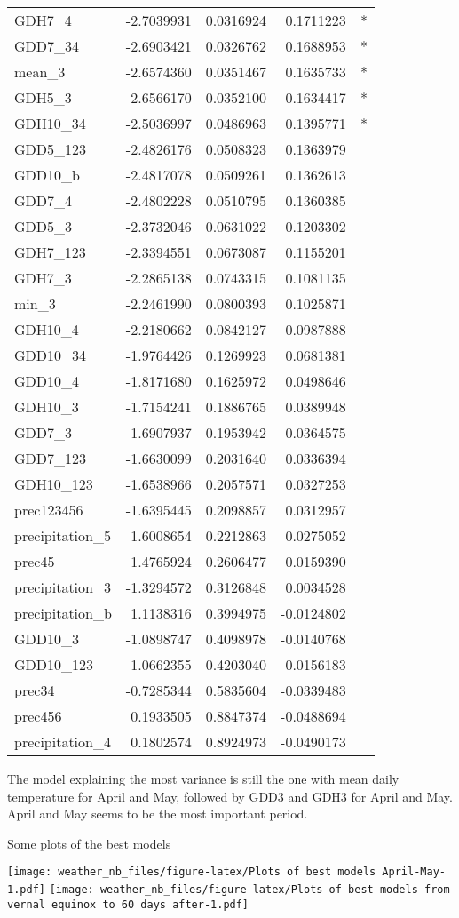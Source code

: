 \documentclass[10pt,]{article}
\begin{document}
\begin{longtable}[]{@{}lrrrl@{}}
GDH7\_4 & -2.7039931 & 0.0316924 & 0.1711223 & *\tabularnewline
GDD7\_34 & -2.6903421 & 0.0326762 & 0.1688953 & *\tabularnewline
mean\_3 & -2.6574360 & 0.0351467 & 0.1635733 & *\tabularnewline
GDH5\_3 & -2.6566170 & 0.0352100 & 0.1634417 & *\tabularnewline
GDH10\_34 & -2.5036997 & 0.0486963 & 0.1395771 & *\tabularnewline
GDD5\_123 & -2.4826176 & 0.0508323 & 0.1363979 &\tabularnewline
GDD10\_b & -2.4817078 & 0.0509261 & 0.1362613 &\tabularnewline
GDD7\_4 & -2.4802228 & 0.0510795 & 0.1360385 &\tabularnewline
GDD5\_3 & -2.3732046 & 0.0631022 & 0.1203302 &\tabularnewline
GDH7\_123 & -2.3394551 & 0.0673087 & 0.1155201 &\tabularnewline
GDH7\_3 & -2.2865138 & 0.0743315 & 0.1081135 &\tabularnewline
min\_3 & -2.2461990 & 0.0800393 & 0.1025871 &\tabularnewline
GDH10\_4 & -2.2180662 & 0.0842127 & 0.0987888 &\tabularnewline
GDD10\_34 & -1.9764426 & 0.1269923 & 0.0681381 &\tabularnewline
GDD10\_4 & -1.8171680 & 0.1625972 & 0.0498646 &\tabularnewline
GDH10\_3 & -1.7154241 & 0.1886765 & 0.0389948 &\tabularnewline
GDD7\_3 & -1.6907937 & 0.1953942 & 0.0364575 &\tabularnewline
GDD7\_123 & -1.6630099 & 0.2031640 & 0.0336394 &\tabularnewline
GDH10\_123 & -1.6538966 & 0.2057571 & 0.0327253 &\tabularnewline
prec123456 & -1.6395445 & 0.2098857 & 0.0312957 &\tabularnewline
precipitation\_5 & 1.6008654 & 0.2212863 & 0.0275052 &\tabularnewline
prec45 & 1.4765924 & 0.2606477 & 0.0159390 &\tabularnewline
precipitation\_3 & -1.3294572 & 0.3126848 & 0.0034528 &\tabularnewline
precipitation\_b & 1.1138316 & 0.3994975 & -0.0124802 &\tabularnewline
GDD10\_3 & -1.0898747 & 0.4098978 & -0.0140768 &\tabularnewline
GDD10\_123 & -1.0662355 & 0.4203040 & -0.0156183 &\tabularnewline
prec34 & -0.7285344 & 0.5835604 & -0.0339483 &\tabularnewline
prec456 & 0.1933505 & 0.8847374 & -0.0488694 &\tabularnewline
precipitation\_4 & 0.1802574 & 0.8924973 & -0.0490173 &\tabularnewline
\bottomrule
\end{longtable}

The model explaining the most variance is still the one with mean daily
temperature for April and May, followed by GDD3 and GDH3 for April and
May.\\
April and May seems to be the most important period.

\newpage

Some plots of the best models

\texttt{[image: weather\_nb\_files/figure-latex/Plots of best models April-May-1.pdf]}
\texttt{[image: weather\_nb\_files/figure-latex/Plots of best models from vernal equinox to 60 days after-1.pdf]}
\end{document}
